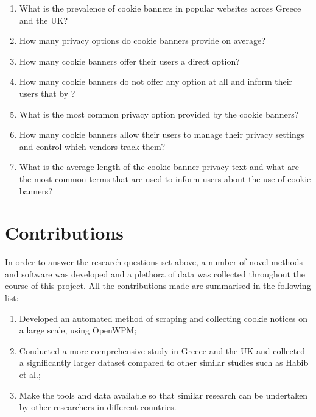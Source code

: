 \documentclass[../main.tex]{subfiles}
\begin{document}
\begin{enumerate}[label=\textbf{RQ\arabic*}:, ref=RQ\arabic*, leftmargin=1.65cm]
    \item \label{rq:prevalence} What is the prevalence of cookie banners in popular websites across Greece and the UK? 
    \item \label{rq:options_avg} How many privacy options do cookie banners provide on average?
    \item \label{rq:direct_opt_out} How many cookie banners offer their users a direct  option?
    \item \label{rq:no_options} How many cookie banners do not offer any option at all and inform their users that by ?
    \item \label{rq:common_ctas} What is the most common privacy option provided by the cookie banners? 
    \item \label{rq:manage_options_count} How many cookie banners allow their users to manage their privacy settings and control which vendors track them?
    \item \label{rq:common_privacy_txt} What is the average length of the cookie banner privacy text and what are the most common terms that are used to inform users about the use of cookie banners?
\end{enumerate}
    
\section{Contributions}

In order to answer the research questions set above, a number of novel methods and software was developed and a plethora of data was collected throughout the course of this project. All the contributions made are summarised in the following list:

\begin{enumerate}
    \item \label{contr_1} Developed an automated method of scraping and collecting cookie notices on a large scale, using OpenWPM;
    \item \label{contr_2} Conducted a more comprehensive study in Greece and the UK and collected a significantly larger dataset compared to other similar studies such as Habib et al.;
    \item \label{contr_3} Make the tools and data available so that similar research can be undertaken by other researchers in different countries.
\end{enumerate}
\end{document}

